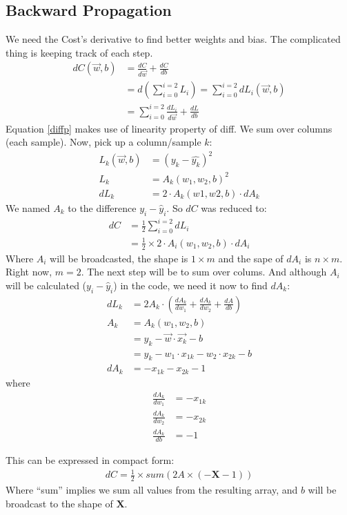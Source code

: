 \subsection{Backward Propagation}
We need the Cost's derivative to find better weights and bias. The complicated thing is keeping track of each step.
\begin{align}
  dC(\vec{w},b) &= \frac{dC}{d\vec{w}} + \frac{dC}{db}\nonumber\\
  &= d(\sum_{i=0}^{i=2}L_i) = \sum_{i=0}^{i=2}dL_i(\vec{w},b) \label{diffp}\\
  &=\sum_{i=0}^{i=2} \frac{dL_i}{d\vec{w}} + \frac{dL}{db}\nonumber
\end{align}
Equation \ref{diffp} makes use of linearity property of diff. We sum over columns (each sample). Now, pick up a column/sample $k$:
\begin{align*}
  L_k(\vec{w},b) &= (y_k - \hat{y_k})^2\\
    L_k &= A_k(w_1, w_2, b)^2\\
    dL_k &= 2\cdot{}A_k(w1,w2,b)\cdot{}dA_k
\end{align*}
We named $A_k$ to the difference $y_i-\hat{y}_i$.
So $dC$ was reduced to:
\begin{align}
  dC &= \frac{1}{2}\sum_{i=0}^{i=2} dL_i\\
  &= \frac{1}{2}\times{}2\cdot{}A_i(w_1, w_2, b)\cdot{}dA_i
\end{align}
Where $A_i$ will be broadcasted, the shape is $1\times{}m$ and the sape of $dA_i$ is $n\times{}m$. Right now, $m=2$. The next step will be to sum over colums. And although $A_i$ will be calculated ($y_i - \hat{y}_i$) in the code, we need it now to find $dA_k$:
\begin{align*}
  dL_k  &= 2A_k\cdot{}(\frac{dA_k}{dw_1} + \frac{dA_k}{dw_2} + \frac{dA}{db}) \\
  A_k &= A_k(w_1, w_2, b)\\
  &= y_k - \vec{w}\cdot{}\vec{x_k} - b\\
  &= y_k - w_1\cdot{}x_{1k} - w_2\cdot{}x_{2k}-b\\
  dA_k &= -x_{1k} - x_{2k} -1
\end{align*}
where 
\begin{align*}
 \frac{dA_{k}}{dw_1} &= -x_{1k}\\ 
  \frac{dA_{k}}{dw_2} &= -x_{2k}\\ 
  \frac{dA_k}{db} &= -1
\end{align*} 

This can be expressed in compact form:
\begin{align}
  dC = \frac{1}{2}\times{}sum(2A\times(-\mathbf{X} -1))
\end{align}
Where ``sum'' implies we sum all values from the resulting array, and $b$ will be broadcast to the shape of $\mathbf{X}$.

